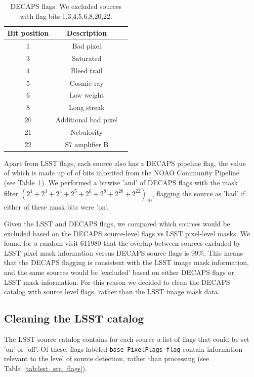 \documentclass[DM,lsstdraft,toc,usenatbib]{lsstdoc}
\begin{document}
\begin{table}
\centering
\caption{DECAPS flags. We excluded sources with flag bits 1,3,4,5,6,8,20,22.}
\label{tab:decaps_flags}
\begin{tabular}{ ccc} 
\hline
Bit position & Description \\ 
\hline
1  &     Bad pixel            \\ 
3  &    Saturated      \\ 
4  &    Bleed trail      \\ 
5  &    Cosmic ray       \\ 
6  &    Low weight      \\ 
8  &    Long streak      \\ 
20  &   Additional bad pixel    \\ 
21 &    Nebulosity     \\ 
22  &   S7 amplifier B        \\ 
\hline
\end{tabular}
\end{table}

Apart from LSST flags, each source also has a DECAPS pipeline flag, the value of which is made up of of bits inherited from the NOAO Community Pipeline (see Table~\ref{tab:decaps_flags}). We performed a bitwise 'and' of DECAPS flags with the mask filter $(2^{1}+ 2^{3}+  2^{4}+  2^{5}+  2^{6}+  2^{8}+  2^{20}+  2^{22})_{10}$, flagging the source as 'bad' if either of these mask bits were 'on'. 

Given the LSST and DECAPS flags, we compared which sources would be excluded based on the DECAPS source-level flags vs LSST pixel-level masks. We found for a random visit  611980  that the overlap between sources excluded by LSST pixel mask information versus DECAPS source flags is 99\%.  This means that the DECAPS flagging is consistent with the LSST image mask information, and the same sources would be 'excluded' based on either DECAPS flags or LSST mask information. For this reason we decided to clean the DECAPS catalog with  source level flags, rather than the LSST image mask data. 
 
\subsection{Cleaning the LSST catalog}
\label{sec:clean_lsst}
The LSST source catalog contains for each source a list of flags that could be set 'on' or 'off'. Of these, flags labeled \verb|base_PixelFlags_flag| contain information relevant to the level of source detection, rather than processing (see Table~\ref{tab:lsst_src_flags}).
\end{document}
